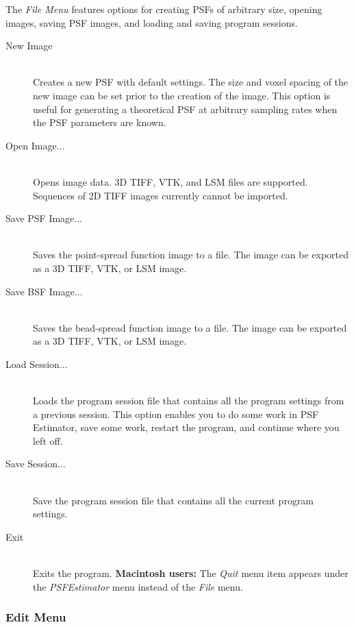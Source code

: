 \documentclass[11pt,titlepage,twoside]{article}
\begin{document}
The \emph{File Menu} features options for creating PSFs of arbitrary size, opening images, saving PSF images, and loading and saving program sessions.

\begin{description}
  \item[New Image] \hfill \\
  Creates a new PSF with default settings. The size and voxel spacing of the new image can be set prior to the creation of the image. This option is useful for generating a theoretical PSF at arbitrary sampling rates when the PSF parameters are known.

  \item[Open Image...] \hfill \\
  Opens image data. 3D TIFF, VTK, and LSM files are supported. Sequences of 2D TIFF images currently cannot be imported.

  \item[Save PSF Image...] \hfill \\
   Saves the point-spread function image to a file. The image can be exported as a 3D TIFF, VTK, or LSM image.
   
  \item[Save BSF Image...] \hfill \\
  Saves the bead-spread function image to a file. The image can be exported as a 3D TIFF, VTK, or LSM image.
  
  \item[Load Session...] \hfill \\
  Loads the program session file that contains all the program settings from a previous session. This option enables you to do some work in PSF Estimator, save some work, restart the program, and continue where you left off.
  
  \item[Save Session...] \hfill \\
  Save the program session file that contains all the current program settings.
  
  \item[Exit] \hfill \\
  Exits the program. \textbf{Macintosh users:} The \emph{Quit} menu item appears under the \emph{PSFEstimator} menu instead of the \emph{File} menu.

\end{description}
\subsubsection{Edit Menu}
\end{document}
